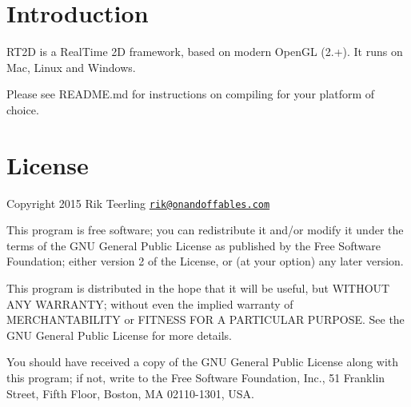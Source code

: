 \hypertarget{index_intro}{}\section{Introduction}\label{index_intro}
R\+T2D is a Real\+Time 2D framework, based on \textquotesingle{}modern\textquotesingle{} Open\+GL (2.+). It runs on Mac, Linux and Windows.

Please see {\ttfamily R\+E\+A\+D\+M\+E.\+md} for instructions on compiling for your platform of choice.\hypertarget{index_license}{}\section{License}\label{index_license}
Copyright 2015 Rik Teerling \href{mailto:rik@onandoffables.com}{\tt rik@onandoffables.\+com}

This program is free software; you can redistribute it and/or modify it under the terms of the G\+NU General Public License as published by the Free Software Foundation; either version 2 of the License, or (at your option) any later version.

This program is distributed in the hope that it will be useful, but W\+I\+T\+H\+O\+UT A\+NY W\+A\+R\+R\+A\+N\+TY; without even the implied warranty of M\+E\+R\+C\+H\+A\+N\+T\+A\+B\+I\+L\+I\+TY or F\+I\+T\+N\+E\+SS F\+OR A P\+A\+R\+T\+I\+C\+U\+L\+AR P\+U\+R\+P\+O\+SE. See the G\+NU General Public License for more details.

You should have received a copy of the G\+NU General Public License along with this program; if not, write to the Free Software Foundation, Inc., 51 Franklin Street, Fifth Floor, Boston, MA 02110-\/1301, U\+SA. 